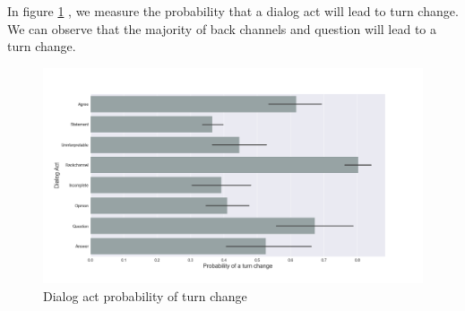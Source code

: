 In figure \ref{f2} , we measure the probability that a dialog act will lead to turn change. We can observe that the majority of back channels and question will lead to a turn change.

\begin{figure}[ht!]
\centering
\includegraphics[width=\textwidth]{../scikitlearn/figures/f2.png}
\caption{Dialog act probability of turn change\label{overflow}}
\label{f2}
\end{figure}
\pagebreak 